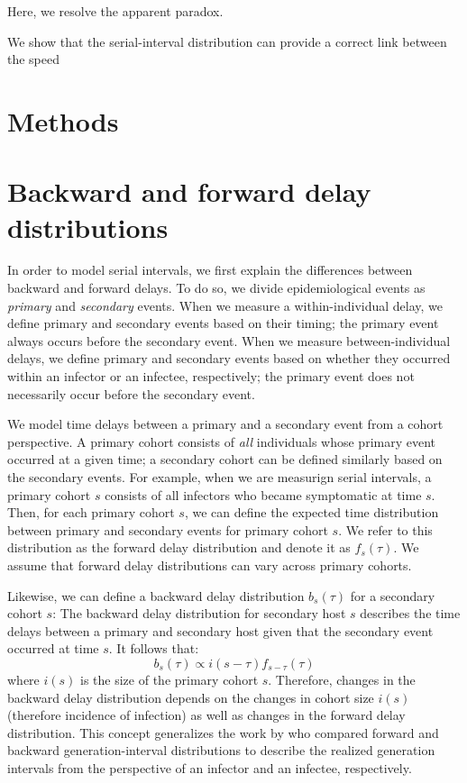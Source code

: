 \documentclass[12pt]{article}
\begin{document}
Here, we resolve the apparent paradox.

We show that the serial-interval distribution can provide a correct link between the speed 

\section{Methods}

\section{Backward and forward delay distributions}

In order to model serial intervals, we first explain the differences between backward and forward delays.
To do so, we divide epidemiological events as \emph{primary} and \emph{secondary} events.
When we measure a within-individual delay, we define primary and secondary events based on their timing;
the primary event always occurs before the secondary event.
When we measure between-individual delays, we define primary and secondary events based on whether they occurred within an infector or an infectee, respectively;
the primary event does not necessarily occur before the secondary event.

We model time delays between a primary and a secondary event from a cohort perspective.
A primary cohort consists of \emph{all} individuals whose primary event occurred at a given time; 
a secondary cohort can be defined similarly based on the secondary events.
For example, when we are measurign serial intervals, a primary cohort $s$ consists of all infectors who became symptomatic at time $s$.
Then, for each primary cohort $s$, we can define the expected time distribution between primary and secondary events for primary cohort $s$.
We refer to this distribution as the forward delay distribution and denote it as $f_s(\tau)$.
We assume that forward delay distributions can vary across primary cohorts.

Likewise, we can define a backward delay distribution $b_s(\tau)$ for a secondary cohort $s$:
The backward delay distribution for secondary host $s$ describes the time delays between a primary and secondary host given that the secondary event occurred at time $s$.
It follows that:
\begin{equation}
b_s(\tau) \propto i(s-\tau) f_{s-\tau}(\tau)
\end{equation}
where $i(s)$ is the size of the primary cohort $s$.
Therefore, changes in the backward delay distribution depends on the changes in cohort size $i(s)$ (therefore incidence of infection) as well as changes in the forward delay distribution.
This concept generalizes the work by \citep{champredon2015intrinsic} who compared forward and backward generation-interval distributions to describe the realized generation intervals from the perspective of an infector and an infectee, respectively.


\end{document}
